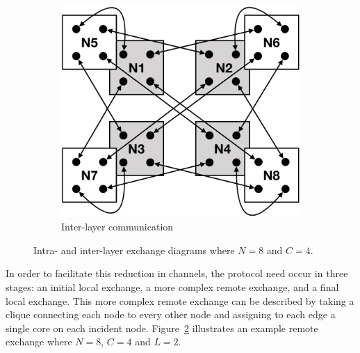 \documentclass{report}
\begin{document}
\begin{figure}
\begin{center}
\begin{subfigure}{0.49\linewidth}
			\centerline{\includegraphics[width=1.0\columnwidth]{inter_layer_nlnr}}
			\caption{Inter-layer communication \label{fig:inter_exchange}}
		\end{subfigure}
		\caption{Intra- and inter-layer exchange diagrams where $N = 8$ and $C = 4$. \label{fig:nlnr}}
	\end{center}
\end{figure}


In order to facilitate this reduction in channels, the protocol need occur in three stages: an initial local exchange, a more complex remote exchange, and a final local exchange.
This more complex remote exchange can be described by taking a clique connecting each node to every other node and assigning to each edge a single core on each incident node.
Figure~\ref{fig:nlnr} illustrates an example remote exchange where $N=8$, $C=4$ and $L=2$.
\end{document}

